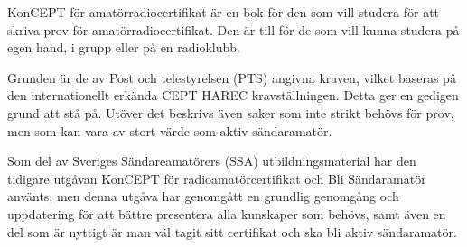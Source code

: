 \newpage
\AddToShipoutPicture*{\BackgroundPicLast}

\color{white}
KonCEPT för amatörradiocertifikat är en bok för den som vill studera för att
skriva prov för amatörradiocertifikat. Den är till för de som vill kunna studera
på egen hand, i grupp eller på en radioklubb.

Grunden är de av Post och telestyrelsen (PTS) angivna kraven, vilket baseras på
den internationellt erkända CEPT HAREC kravställningen. Detta ger en gedigen
grund att stå på. Utöver det beskrivs även saker som inte strikt behövs för
prov, men som kan vara av stort värde som aktiv sändaramatör.

Som del av Sveriges Sändareamatörers (SSA) utbildningsmaterial har den tidigare
utgåvan KonCEPT för radioamatörcertifikat och Bli Sändaramatör använts, men
denna utgåva har genomgått en grundlig genomgång och uppdatering för att
bättre presentera alla kunskaper som behövs, samt även en del som är nyttigt
är man väl tagit sitt certifikat och ska bli aktiv sändaramatör.
